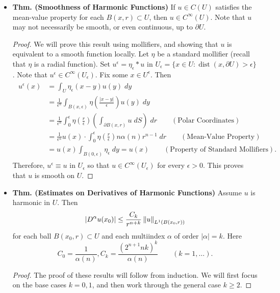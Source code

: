 \documentclass{article}
\begin{document}
\begin{itemize}
		\item \textbf{Thm. (Smoothness of Harmonic Functions)} If $u \in C(U)$ satisfies the mean-value property for each $B(x, r) \subset U$, then $u \in C^{\infty}(U)$. Note that $u$ may not necessarily be smooth, or even continuous, up to $\partial U$. 
		
		\begin{proof}
			We will prove this result using mollifiers, and showing that $u$ is equivalent to a smooth function locally. Let $\eta$ be a standard mollifier (recall that $\eta$ is a radial function). Set $u^{\epsilon} = \eta_{\epsilon} \ast u$ in $U_{\epsilon} = \{x \in U: \operatorname{dist}(x, \partial U) >\epsilon\}$. Note that $u^{\epsilon} \in C^{\infty}(U_{\epsilon})$. Fix some $x \in U^{\epsilon}$. Then 
			\begin{align*}
				\begin{split}
					u^{\epsilon}(x) &= \int_{U}\eta_{\epsilon}(x - y)u(y)\;dy \\
					&= \frac{1}{\epsilon^{n}}\int_{B(x, \epsilon)}\eta\left(\frac{|x-y|}{\epsilon}\right)u(y)\;dy  \\
					&= \frac{1}{\epsilon^{n}}\int_{0}^{\epsilon}\eta\left(\frac{r}{\epsilon}\right) \left(\int_{\partial B(x, r)}u\;dS\right)\;dr \qquad (\text{Polar Coordinates}) \\
					&= \frac{1}{\epsilon^{n}}u(x) \cdot \int_{0}^{\epsilon}\eta\left(\frac{r}{\epsilon}\right)n\alpha(n)r^{n-1}\;dr \qquad (\text{Mean-Value Property}) \\
					&= u(x) \int_{B(0,\epsilon)}\eta_{\epsilon}\;dy = u(x) \qquad (\text{Property of Standard Mollifiers}). 
				\end{split}
			\end{align*}
			Therefore, $u^{\epsilon} \equiv u$ in $U_{\epsilon}$ so that $u \in C^{\infty}(U_{\epsilon})$ for every $\epsilon > 0$. This proves that $u$ is smooth on $U$. 
		\end{proof}
		
		\item \textbf{Thm. (Estimates on Derivatives of Harmonic Functions)} Assume $u$ is harmonic in $U$. Then 
		\begin{equation*}
			|D^{\alpha}u(x_{0})| \leq \frac{C_{k}}{r^{n + k}}\left\Vert u \right\Vert_{L^{1}(B(x_{0}, r))}
		\end{equation*}
		for each ball $B(x_{0}, r) \subset U$ and each multiindex $\alpha$ of order $|\alpha| = k$. Here 
		\begin{equation*}
			C_{0} = \frac{1}{\alpha(n)}, C_{k} = \frac{(2^{n + 1}nk)^{k}}{\alpha(n)} \qquad (k = 1, \ldots). 
		\end{equation*}
		\begin{proof}
			The proof of these results will follow from induction. We will first focus on the base cases $k = 0, 1$, and then work through the general case $k \geq 2$. 
			

\end{proof}
\end{itemize}
\end{document}

